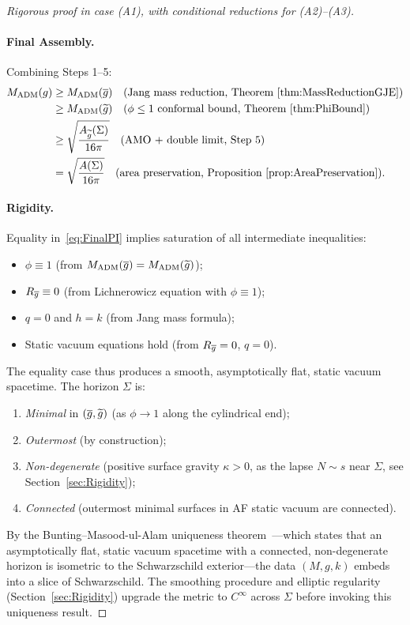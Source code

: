 \begin{proof}[Rigorous proof in case (A1), with conditional reductions for (A2)--(A3)]
\paragraph{Final Assembly.}
Combining Steps 1--5:
\begin{align}
    M_{\mathrm{ADM}}(g) &\ge M_{\mathrm{ADM}}(\overline{g}) \quad \text{(Jang mass reduction, Theorem~\ref{thm:MassReductionGJE})} \\
    &\ge M_{\mathrm{ADM}}(\widetilde{g}) \quad \text{($\phi \le 1$ conformal bound, Theorem~\ref{thm:PhiBound})} \\
    &\ge \sqrt{\frac{A_{\widetilde{g}}(\Sigma)}{16\pi}} \quad \text{(AMO + double limit, Step 5)} \\
    &= \sqrt{\frac{A(\Sigma)}{16\pi}} \quad \text{(area preservation, Proposition~\ref{prop:AreaPreservation})}.
\end{align}

\paragraph{Rigidity.}
Equality in~\eqref{eq:FinalPI} implies saturation of all intermediate inequalities:
\begin{itemize}
    \item $\phi \equiv 1$ (from $M_{\mathrm{ADM}}(\overline{g}) = M_{\mathrm{ADM}}(\widetilde{g})$);
    \item $R_{\overline{g}} \equiv 0$ (from Lichnerowicz equation with $\phi \equiv 1$);
    \item $q = 0$ and $h = k$ (from Jang mass formula);
    \item Static vacuum equations hold (from $R_{\overline{g}} = 0$, $q = 0$).
\end{itemize}
The equality case thus produces a smooth, asymptotically flat, static vacuum spacetime. The horizon $\Sigma$ is:
\begin{enumerate}
    \item \emph{Minimal} in $(\overline{g}, \widetilde{g})$ (as $\phi \to 1$ along the cylindrical end);
    \item \emph{Outermost} (by construction);
    \item \emph{Non-degenerate} (positive surface gravity $\kappa > 0$, as the lapse $N \sim s$ near $\Sigma$, see Section~\ref{sec:Rigidity});
    \item \emph{Connected} (outermost minimal surfaces in AF static vacuum are connected).
\end{enumerate}
By the Bunting--Masood-ul-Alam uniqueness theorem~\cite{buntingmasood1987}---which states that an asymptotically flat, static vacuum spacetime with a connected, non-degenerate horizon is isometric to the Schwarzschild exterior---the data $(M, g, k)$ embeds into a slice of Schwarzschild. The smoothing procedure and elliptic regularity (Section~\ref{sec:Rigidity}) upgrade the metric to $C^\infty$ across $\Sigma$ before invoking this uniqueness result.
\end{proof}

